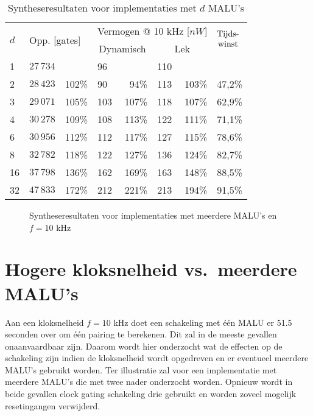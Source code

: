 \begin{table}[h]
	\caption{Syntheseresultaten voor implementaties met $d$ MALU's}
	\label{tabel-resultaten-md}

	\centering
	\begin{tabular}{llrlrlrl}
		\toprule
		\multirow{2}{*}{$d$} & \multicolumn{2}{l}{\multirow{2}{*}{Opp. [gates]}}	& \multicolumn{4}{c}{Vermogen @ 10 kHz [$nW$]}	& \multirow{2}{*}{$\begin{array}{@{}c@{}}\text{Tijds-}\\\text{winst}\end{array}$}\\
		\cmidrule{4-7}
		&	& & \multicolumn{2}{c}{Dynamisch}	& \multicolumn{2}{c}{Lek}	&\\
		\midrule
		1			& $27\,734$	& 			& 96	& 			& 110	& 			& \\
		2			& $28\,423$	& 102\%	& 90	& 94\%	& 113	& 103\%	& 47,2\%\\
		3			& $29\,071$	& 105\%	& 103	& 107\%	& 118	& 107\%	& 62,9\%\\
		4			& $30\,278$	& 109\%	& 108	& 113\%	& 122	& 111\%	& 71,1\%\\
		6			& $30\,956$	& 112\%	& 112	& 117\%	& 127	& 115\%	& 78,6\%\\
		8			& $32\,782$	& 118\%	& 122	& 127\%	& 136	& 124\%	& 82,7\%\\
		16			& $37\,798$	& 136\%	& 162	& 169\%	& 163	& 148\%	& 88,5\%\\
		32			& $47\,833$	& 172\%	& 212	& 221\%	& 213	& 194\%	& 91,5\%\\
		\hline		
	\end{tabular}
\end{table}

\begin{figure}[h]
	\centering
		\caption{Syntheseresultaten voor implementaties met meerdere MALU's en $f = 10$ kHz\label{figuur-resultaten-md}}
\end{figure}

\section{Hogere kloksnelheid vs.\ meerdere MALU's}

Aan een kloksnelheid $f = 10$ kHz doet een schakeling met \'e\'en MALU er 51.5 seconden over om \'e\'en pairing te berekenen. Dit zal  in de meeste gevallen onaanvaardbaar zijn. Daarom wordt hier onderzocht wat de effecten op de schakeling zijn indien de kloksnelheid wordt opgedreven en er eventueel meerdere MALU's gebruikt worden. Ter illustratie zal voor een implementatie met meerdere MALU's die met twee nader onderzocht worden. Opnieuw wordt in beide gevallen clock gating schakeling drie gebruikt en worden zoveel mogelijk resetingangen verwijderd.

